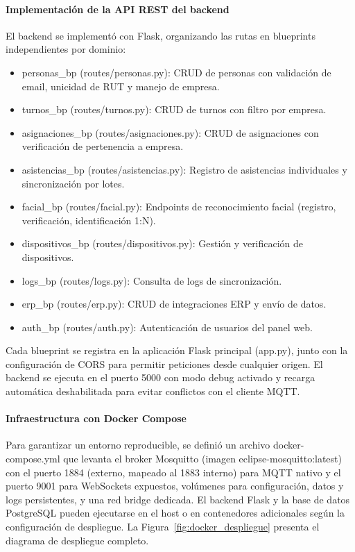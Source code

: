 \paragraph{Implementación de la API REST del backend}

El backend se implementó con Flask, organizando las rutas en blueprints independientes por dominio:
\begin{itemize}
    \item personas\_bp (routes/personas.py): CRUD de personas con validación de email, unicidad de RUT y manejo de empresa.
    \item turnos\_bp (routes/turnos.py): CRUD de turnos con filtro por empresa.
    \item asignaciones\_bp (routes/asignaciones.py): CRUD de asignaciones con verificación de pertenencia a empresa.
    \item asistencias\_bp (routes/asistencias.py): Registro de asistencias individuales y sincronización por lotes.
    \item facial\_bp (routes/facial.py): Endpoints de reconocimiento facial (registro, verificación, identificación 1:N).
    \item dispositivos\_bp (routes/dispositivos.py): Gestión y verificación de dispositivos.
    \item logs\_bp (routes/logs.py): Consulta de logs de sincronización.
    \item erp\_bp (routes/erp.py): CRUD de integraciones ERP y envío de datos.
    \item auth\_bp (routes/auth.py): Autenticación de usuarios del panel web.
\end{itemize}

Cada blueprint se registra en la aplicación Flask principal (app.py), junto con la configuración de CORS para permitir peticiones desde cualquier origen. El backend se ejecuta en el puerto 5000 con modo debug activado y recarga automática deshabilitada para evitar conflictos con el cliente MQTT.

\paragraph{Infraestructura con Docker Compose}

Para garantizar un entorno reproducible, se definió un archivo docker-compose.yml que levanta el broker Mosquitto (imagen eclipse-mosquitto:latest) con el puerto 1884 (externo, mapeado al 1883 interno) para MQTT nativo y el puerto 9001 para WebSockets expuestos, volúmenes para configuración, datos y logs persistentes, y una red bridge dedicada. El backend Flask y la base de datos PostgreSQL pueden ejecutarse en el host o en contenedores adicionales según la configuración de despliegue. La Figura~\ref{fig:docker_despliegue} presenta el diagrama de despliegue completo.

